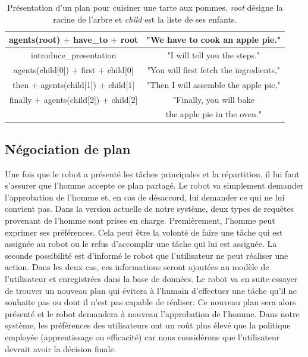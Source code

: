 \documentclass[a4paper,11pt,twoside]{StyleThese}
\begin{document}
 
 \begin{table}
\centering
\scriptsize
\renewcommand{\arraystretch}{1.3}
\begin{tabular}{|c|c|}
\hline
   agents(root) $+$ have\_to $+$ root  & "We have to cook an apple pie." \\
   \hline
   introduce\_presentation & "I will tell you the steps." \\
   \hline
   agents(child[0]) $+$ first $+$ child[0] & "You will first fetch the ingredients," \\
   \hline
   then $+$ agents(child[1]) $+$  child[1] & "Then I will assemble the apple pie," \\
   \hline
   finally $+$ agents(child[2]) $+$  child[2] & "Finally, you will bake \\
   & the apple pie in the oven." \\
   \hline
\end{tabular}
\caption{Présentation d'un plan pour cuisiner une tarte aux pommes. \textit{root} désigne la racine de l'arbre et \textit{child} est la liste de ses enfants.}
 \label{table:pie-present}    
\end{table}
 

\subsection{Négociation de plan}
\label{sec:planNego}
Une fois que le robot a présenté les tâches principales et la répartition, il lui faut s'assurer que l'homme accepte ce plan partagé. Le robot va simplement demander l'approbation de l'homme et, en cas de désaccord, lui demander ce qui ne lui convient pas.
Dans la version actuelle de notre système, deux types de requêtes provenant de l'homme sont prises en charge. Premièrement, l'homme peut exprimer ses préférences. Cela peut être la volonté de faire une tâche qui est assignée au robot ou le refus d'accomplir une tâche qui lui est assignée. La seconde possibilité est d'informé le robot que l'utilisateur ne peut réaliser une action. Dans les deux cas, ces informations seront ajoutées au modèle de l'utilisateur et enregistrées dans la base de données. Le robot va en suite essayer de trouver un nouveau plan qui évitera à l'humain d'effectuer une tâche qu'il ne souhaite pas ou dont il n'est pas capable de réaliser. Ce nouveau plan sera alors présenté et le robot demandera à nouveau l'approbation de l'homme. Dans notre système, les préférences des utilisateurs ont un coût plus élevé que la politique employée (apprentissage ou efficacité) car nous considérons que l'utilisateur devrait avoir la décision finale.
\end{document}
